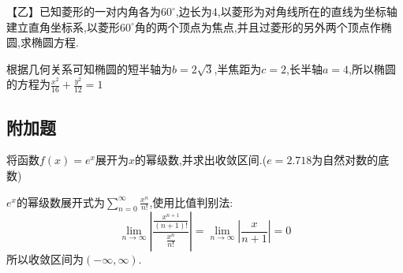 \begin{questions}
	【乙】已知菱形的一对内角各为$60^\circ$,边长为$4$,以菱形为对角线所在的直线为坐标轴建立直角坐标系,以菱形$60^\circ$角的两个顶点为焦点,并且过菱形的另外两个顶点作椭圆,求椭圆方程.
	\begin{figure}[htbp]
		\centering
	\end{figure}

	根据几何关系可知椭圆的短半轴为$b=2\sqrt{3}$,半焦距为$c=2$,长半轴$a=4$,所以椭圆的方程为$\frac{x^2}{16} +
		\frac{y^2}{12} = 1$
	\begin{center}
		\subsection*{附加题}
	\end{center}
	\question 将函数$f(x)=e^x$展开为$x$的幂级数,并求出收敛区间.($e=2.718$为自然对数的底数)
	\begin{solution}
		$e^x$的幂级数展开式为$\displaystyle\sum_{n=0}^{\infty}\frac{x^n}{n!}$,使用比值判别法:
		\begin{equation*}
			\lim_{n\to\infty}\left| \frac{\frac{x^{n+1}}{(n+1)!}}{\frac{x^n}{n!}}\right| =
			\lim_{n\to\infty}\left|\frac{x}{n+1}\right|
			= 0
		\end{equation*}
		所以收敛区间为$(-\infty, \infty)$.
	\end{solution}


\end{questions}
